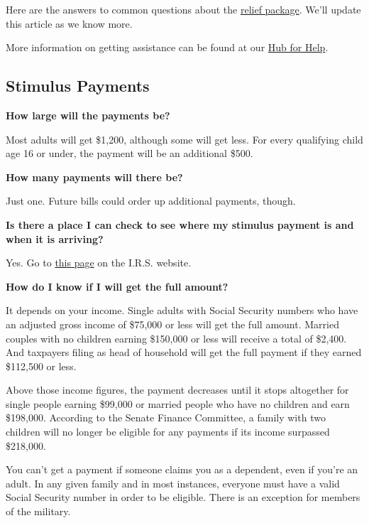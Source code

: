 Here are the answers to common questions about the
\href{https://www.nytimes.com/2020/06/02/business/economy/major-employers-coronavirus-relief.html}{relief
package}. We'll update this article as we know more.

More information on getting assistance can be found at our
\href{https://www.nytimes.com/article/coronavirus-money-unemployment.html}{Hub
for Help}.

\hypertarget{stimulus-payments}{%
\subsection{Stimulus Payments}\label{stimulus-payments}}

\textbf{How large will the payments be?}

Most adults will get \$1,200, although some will get less. For every
qualifying child age 16 or under, the payment will be an additional
\$500.

\textbf{How many payments will there be?}

Just one. Future bills could order up additional payments, though.

\textbf{Is there a place I can check to see where my stimulus payment is
and when it is arriving?}

Yes. Go to \href{https://www.irs.gov/coronavirus/get-my-payment}{this
page} on the I.R.S. website.

\textbf{How do I know if I will get the full amount?}

It depends on your income. Single adults with Social Security numbers
who have an adjusted gross income of \$75,000 or less will get the full
amount. Married couples with no children earning \$150,000 or less will
receive a total of \$2,400. And taxpayers filing as head of household
will get the full payment if they earned \$112,500 or less.

Above those income figures, the payment decreases until it stops
altogether for single people earning \$99,000 or married people who have
no children and earn \$198,000. According to the Senate Finance
Committee, a family with two children will no longer be eligible for any
payments if its income surpassed \$218,000.

You can't get a payment if someone claims you as a dependent, even if
you're an adult. In any given family and in most instances, everyone
must have a valid Social Security number in order to be eligible. There
is an exception for members of the military.

